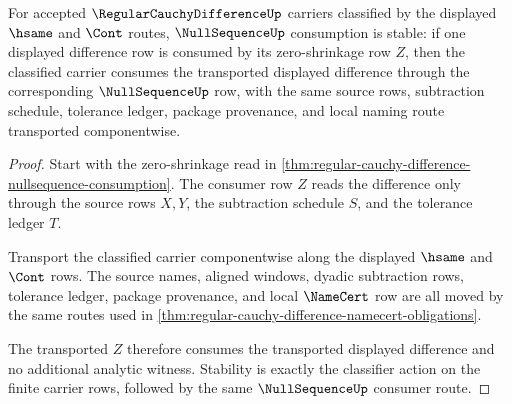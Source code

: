 \begin{theorem}
\label{thm:regular-cauchy-difference-nullsequence-classifier-stability}
For accepted $\RegularCauchyDifferenceUp$ carriers classified by the displayed $\hsame$ and $\Cont$ routes, $\NullSequenceUp$ consumption is stable: if one displayed difference row is consumed by its zero-shrinkage row $Z$, then the classified carrier consumes the transported displayed difference through the corresponding $\NullSequenceUp$ row, with the same source rows, subtraction schedule, tolerance ledger, package provenance, and local naming route transported componentwise.
\end{theorem}
\begin{proof}
Start with the zero-shrinkage read in \autoref{thm:regular-cauchy-difference-nullsequence-consumption}. The consumer row $Z$ reads the difference only through the source rows $X,Y$, the subtraction schedule $S$, and the tolerance ledger $T$.

Transport the classified carrier componentwise along the displayed $\hsame$ and $\Cont$ rows. The source names, aligned windows, dyadic subtraction rows, tolerance ledger, package provenance, and local $\NameCert$ row are all moved by the same routes used in \autoref{thm:regular-cauchy-difference-namecert-obligations}.

The transported $Z$ therefore consumes the transported displayed difference and no additional analytic witness. Stability is exactly the classifier action on the finite carrier rows, followed by the same $\NullSequenceUp$ consumer route.
\end{proof}

